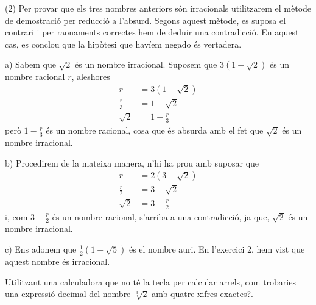 \begin{solucio}
(2) Per provar que els tres nombres anteriors són irracionals
utilitzarem el mètode de demostració per reducció a l’absurd.
Segons aquest mètode, es suposa el contrari i per raonaments
correctes hem de deduir una contradicció. En aquest cas, es conclou
que la hipòtesi que havíem negado és vertadera.

a) Sabem que $\sqrt{2}$ és un nombre irracional. Suposem que $3(1-%
\sqrt{2})$ és un nombre racional $r$, aleshores%
\begin{align*}
r &=3(1-\sqrt{2}) \\
\frac{r}{3} &=1-\sqrt{2} \\
\sqrt{2} &=1-\frac{r}{3}
\end{align*}%
però $1-\frac{r}{3}$ és un nombre racional, cosa que és absurda amb el
fet que $\sqrt{2}$ és un nombre irracional.

b) Procedirem de la mateixa manera, n’hi ha prou amb suposar que%
\begin{align*}
r &=2(3-\sqrt{2}) \\
\frac{r}{2} &=3-\sqrt{2} \\
\sqrt{2} &=3-\frac{r}{2}
\end{align*}%
i, com $3-\frac{r}{2}$ és un nombre racional, s’arriba a una contradicció, ja que, $\sqrt{2}$ és un nombre irracional.

c) Ens adonem que $\frac{1}{2}(1+\sqrt{5})$ és el nombre auri. En l’exercici 2, hem vist que aquest nombre és irracional.
\end{solucio}

\begin{exercici}
Utilitzant una calculadora que no té la tecla per calcular arrels, 
com trobaries una expressió decimal del nombre $\sqrt[3]{2}$ amb quatre xifres exactes?.

\end{exercici}

